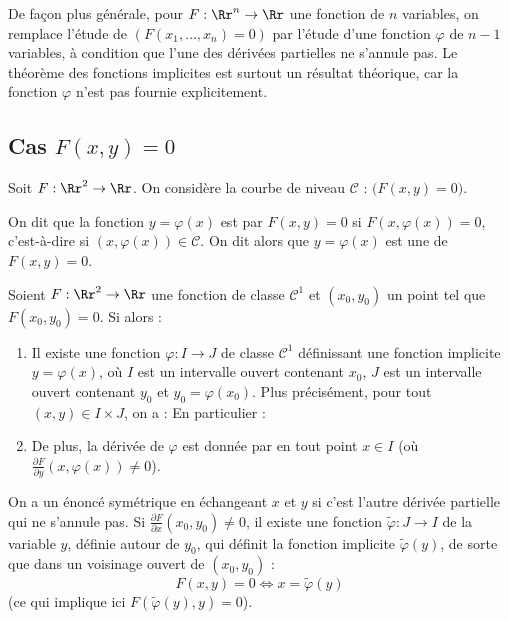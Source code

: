 \documentclass[11pt, class=report,crop=false]{standalone}
\begin{document}
\bigskip


De façon plus générale, pour $F : \Rr^n \to \Rr$ une fonction de $n$ variables, on remplace l'étude de $(F(x_1,\ldots,x_n)=0)$ par l'étude d'une fonction $\varphi$ de $n-1$ variables, à condition que l'une des dérivées partielles ne s'annule pas.
Le théorème des fonctions implicites est surtout un résultat théorique, car la fonction $\varphi$ n'est pas fournie explicitement.



\subsection{Cas $F(x,y) = 0$}

Soit $F : \Rr^2 \to \Rr$. On considère la courbe de niveau 
$\mathcal{C}$ : $\big( F(x,y) = 0 \big)$.

On dit que la fonction $y = \varphi(x)$ est  par $F(x,y) = 0$ si $F(x,\varphi(x)) = 0$, c'est-à-dire si $(x,\varphi(x)) \in \mathcal{C}$.
On dit alors que $y = \varphi(x)$ est une  de $F(x,y) = 0$.

    
\begin{theoreme}
Soient $F : \Rr^2 \to \Rr$ une fonction de classe $\mathcal{C}^1$ et $(x_0,y_0)$ un point tel que $F(x_0,y_0) = 0$.
Si 
alors :
\begin{enumerate}
    \item Il existe une fonction $\varphi : I \to J$ de classe $\mathcal{C}^1$ définissant une fonction implicite $y = \varphi(x)$, où $I$ est un intervalle ouvert contenant $x_0$, $J$ est un intervalle ouvert contenant $y_0$ et $y_0 = \varphi(x_0)$.
    Plus précisément, pour tout $(x,y) \in I \times J$, on a :
    En particulier : 
    
    
    \item De plus, la dérivée de $\varphi$ est donnée par 
     en tout point $x \in I$ (où $\frac{\partial F}{\partial y}(x,\varphi(x)) \neq 0$).
\end{enumerate}
\end{theoreme}


On a un énoncé symétrique en échangeant $x$ et $y$ si c'est l'autre dérivée partielle qui ne s'annule pas.
Si $\frac{\partial F}{\partial x}(x_0,y_0) \neq 0$, 
il existe une fonction $\tilde\varphi : J \to I$ 
de la variable $y$, définie autour de $y_0$, qui définit la fonction implicite $\tilde\varphi(y)$, de sorte que dans un voisinage ouvert de $(x_0,y_0)$ :
$$F(x,y) = 0 \iff x = \tilde\varphi(y)$$
(ce qui implique ici $F(\tilde\varphi(y),y)=0$).
\end{document}

